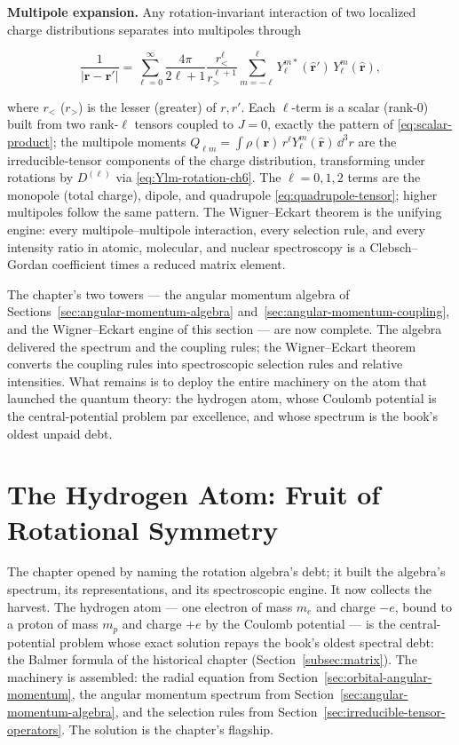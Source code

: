 \medskip\noindent\textbf{Multipole expansion.} Any rotation-invariant interaction of two localized charge distributions separates into multipoles through
\begin{linenomath}
  \begin{equation}
    \frac{1}{|\bm r-\bm r'|}=\sum_{\ell=0}^{\infty}\frac{4\pi}{2\ell+1}\frac{r_{<}^{\ell}}{r_{>}^{\ell+1}}\sum_{m=-\ell}^{\ell}Y_{\ell}^{m*}(\hat{\bm r}')\,Y_{\ell}^{m}(\hat{\bm r}),
    \label{eq:multipole-expansion}
  \end{equation}
\end{linenomath}
where $r_{<}$ ($r_{>}$) is the lesser (greater) of $r,r'$. Each $\ell$-term is a scalar (rank-0) built from two rank-$\ell$ tensors coupled to $J=0$, exactly the pattern of \eqref{eq:scalar-product}; the multipole moments $Q_{\ell m}=\int\rho(\bm r)\,r^{\ell}Y_{\ell}^{m}(\hat{\bm r})\,\dd^{3}r$ are the irreducible-tensor components of the charge distribution, transforming under rotations by $D^{(\ell)}$ via \eqref{eq:Ylm-rotation-ch6}. The $\ell=0,1,2$ terms are the monopole (total charge), dipole, and quadrupole \eqref{eq:quadrupole-tensor}; higher multipoles follow the same pattern. The Wigner--Eckart theorem is the unifying engine: every multipole--multipole interaction, every selection rule, and every intensity ratio in atomic, molecular, and nuclear spectroscopy is a Clebsch--Gordan coefficient times a reduced matrix element.

The chapter's two towers --- the angular momentum algebra of Sections~\ref{sec:angular-momentum-algebra} and~\ref{sec:angular-momentum-coupling}, and the Wigner--Eckart engine of this section --- are now complete. The algebra delivered the spectrum and the coupling rules; the Wigner--Eckart theorem converts the coupling rules into spectroscopic selection rules and relative intensities. What remains is to deploy the entire machinery on the atom that launched the quantum theory: the hydrogen atom, whose Coulomb potential is the central-potential problem par excellence, and whose spectrum is the book's oldest unpaid debt.

\section{The Hydrogen Atom: Fruit of Rotational Symmetry}
\label{sec:hydrogen-atom}

The chapter opened by naming the rotation algebra's debt; it built the algebra's spectrum, its representations, and its spectroscopic engine. It now collects the harvest. The hydrogen atom --- one electron of mass $m_e$ and charge $-e$, bound to a proton of mass $m_p$ and charge $+e$ by the Coulomb potential --- is the central-potential problem whose exact solution repays the book's oldest spectral debt: the Balmer formula of the historical chapter (Section~\ref{subsec:matrix}). The machinery is assembled: the radial equation from Section~\ref{sec:orbital-angular-momentum}, the angular momentum spectrum from Section~\ref{sec:angular-momentum-algebra}, and the selection rules from Section~\ref{sec:irreducible-tensor-operators}. The solution is the chapter's flagship.

